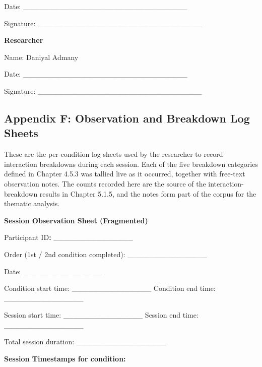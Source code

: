 \documentclass[
]{article}
\begin{document}
Date: \_\_\_\_\_\_\_\_\_\_\_\_\_\_\_\_\_\_\_\_\_\_\_\_\_\_\_\_\_\_\_

Signature: \_\_\_\_\_\_\_\_\_\_\_\_\_\_\_\_\_\_\_\_\_\_\_\_\_\_\_\_\_\_\_

\textbf{Researcher}

Name: Daniyal Admany

Date: \_\_\_\_\_\_\_\_\_\_\_\_\_\_\_\_\_\_\_\_\_\_\_\_\_\_\_\_\_\_\_

Signature: \_\_\_\_\_\_\_\_\_\_\_\_\_\_\_\_\_\_\_\_\_\_\_\_\_\_\_\_\_\_\_

\clearpage
\hypertarget{appendix-e-observation-and-breakdown-log-sheets}{%
\subsection{\texorpdfstring{Appendix F: Observation and Breakdown Log Sheets }{Appendix F: Observation and Breakdown Log Sheets }}\label{appendix-e-observation-and-breakdown-log-sheets}}

These are the per-condition log sheets used by the researcher to record interaction breakdowns during each session. Each of the five breakdown categories defined in Chapter 4.5.3 was tallied live as it occurred, together with free-text observation notes. The counts recorded here are the source of the interaction-breakdown results in Chapter 5.1.5, and the notes form part of the corpus for the thematic analysis.

\textbf{Session Observation Sheet (Fragmented)}

Participant ID\textbf{:} \_\_\_\_\_\_\_\_\_\_\_\_\_\_\_

Order (1st / 2nd condition completed): \_\_\_\_\_\_\_\_\_\_\_\_\_\_\_

Date: \_\_\_\_\_\_\_\_\_\_\_\_\_\_\_

Condition start time: \_\_\_\_\_\_\_\_\_\_\_\_\_\_\_ Condition end time: \_\_\_\_\_\_\_\_\_\_\_\_\_\_\_

Session start time: \_\_\_\_\_\_\_\_\_\_\_\_\_\_\_ Session end time: \_\_\_\_\_\_\_\_\_\_\_\_\_\_\_

Total session duration: \_\_\_\_\_\_\_\_\_\_\_\_\_\_\_\_\_

\textbf{Session Timestamps for condition:}
\end{document}
